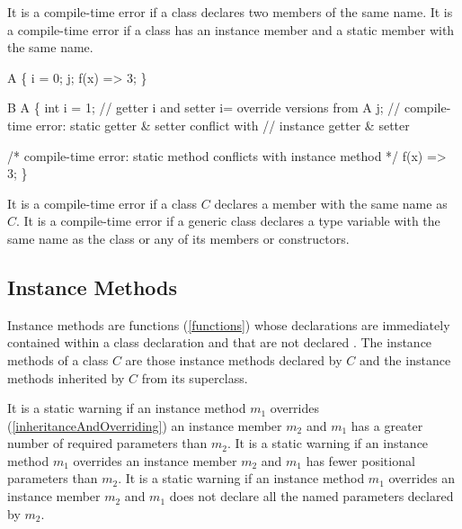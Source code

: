 \documentclass{article}
\begin{document}
\LMHash{}
It is a compile-time error if a class declares two members of the same name.
It is a compile-time error if a class has an instance member and a static member with the same name.


\begin{dartCode}
\CLASS{} A \{
  \VAR{} i = 0;
  \VAR{} j;
  f(x) => 3;
\}

\CLASS{} B \EXTENDS{} A \{
  int i = 1; // getter i and setter i= override versions from A
  \STATIC{} j; // compile-time error: static getter \& setter conflict with
  // instance getter \& setter

  /* compile-time error: static method conflicts with instance method */
  \STATIC{} f(x) => 3;
\}
\end{dartCode}

\LMHash{}
It is a compile-time error if a class $C$ declares a member with the same name as $C$.
It is a compile-time error if a generic class declares a type variable with the same name as the class or any of its members or constructors.


\subsection{Instance Methods}

\LMHash{}
Instance methods are functions (\ref{functions}) whose declarations are immediately contained within a class declaration and that are not declared \STATIC{}.
The instance methods of a class $C$ are those instance methods declared by $C$ and the instance methods inherited by $C$ from its superclass.


\LMHash{}
It is a static warning if an instance method $m_1$ overrides (\ref{inheritanceAndOverriding}) an instance member $m_2$ and $m_1$ has a greater number of required parameters than $m_2$.
It is a static warning if an instance method $m_1$ overrides an instance member $m_2$ and $m_1$ has fewer positional parameters than $m_2$.
It is a static warning if an instance method $m_1$ overrides an instance member $m_2$ and $m_1$ does not declare all the named parameters declared by $m_2$.
\end{document}
